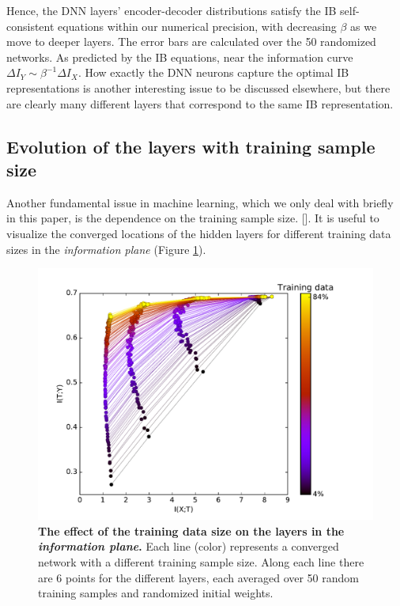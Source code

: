 \documentclass[11pt]{article}
\newcommand{\ignore}[1]{}
\begin{document}
Hence, the DNN layers' encoder-decoder distributions satisfy the IB self-consistent
equations within our numerical precision, with decreasing  $\beta$ as we move to deeper layers.  
The error bars are calculated over the 50 randomized networks. 
As predicted by the IB equations, near the information curve $\Delta I_Y \sim \beta^{-1} \Delta I_X$. 
How exactly the DNN neurons capture the optimal IB representations is another interesting issue to be discussed elsewhere, but there are clearly many different layers that correspond to the same IB representation.

\subsection{Evolution of the layers with training sample size}

Another fundamental issue in machine learning, which we only deal with briefly in this paper, is the dependence on the training sample size.
\ignore{\ravidcomment{I add some reference of someone that explores the accuracy as function the data sizes in datasets of images, do you think we need to keep it? }} [\citet{cho2015much}].
It is useful to visualize the converged locations of the hidden layers for different training data sizes
in the \textit{information plane} (Figure \ref{samples_layers}).

\begin{figure}[h]
\begin{centering}
\includegraphics[scale = 0.65]{sample_complex.pdf}
\par\end{centering}
\caption{\label{samples_layers}\textbf{The effect of the training data size
on the layers in the \textit{information plane}.} Each line (color) represents a converged network with a different training sample size. Along each line there are 6 points for the different layers, each averaged over 50 random training samples and randomized initial weights.}
\end{figure}
\vskip -0.1in 
\end{document}
